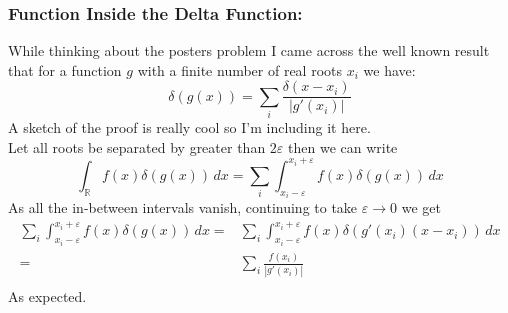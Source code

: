 \subsubsection{Function Inside the Delta Function:}
While thinking about the posters problem I came across the well known result that for a function $g$ with a finite number of real roots $x_i$ we have:
\[\delta(g(x)) = \sum_i\frac{\delta(x-x_i)}{|g'(x_i)|}\]
A sketch of the proof is really cool so I'm including it here.
\\

Let all roots be separated by greater than $2\varepsilon$ then we can write
\[\int_\mathbb{R}f(x)\delta(g(x))\,dx = \sum_i\int_{x_i-\varepsilon}^{x_i+\varepsilon}f(x)\delta(g(x))\,dx\]
As all the in-between intervals vanish,
continuing to take $\varepsilon\rightarrow 0$ we get
\[\begin{aligned}
	\sum_i\int_{x_i-\varepsilon}^{x_i+\varepsilon}f(x)\delta(g(x))\,dx =& \sum_i\int_{x_i-\varepsilon}^{x_i+\varepsilon}f(x)\delta(g'(x_i)(x-x_i))\,dx\\
	=&\sum_i\frac{f(x_i)}{|g'(x_i)|}\\
\end{aligned}\]
As expected.
